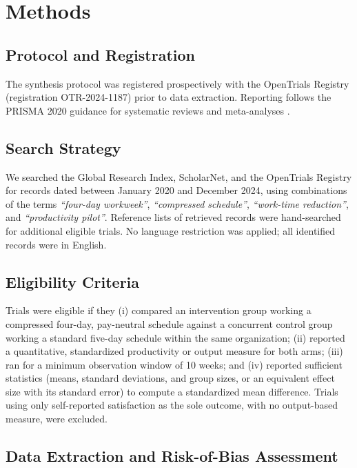 \section{Methods}

\subsection{Protocol and Registration}

The synthesis protocol was registered prospectively with the OpenTrials Registry
(registration OTR-2024-1187) prior to data extraction. Reporting follows the PRISMA 2020
guidance for systematic reviews and meta-analyses \citep{page2021prisma}.

\subsection{Search Strategy}

We searched the Global Research Index, ScholarNet, and the OpenTrials Registry for records
dated between January 2020 and December 2024, using combinations of the terms
\emph{``four-day workweek''}, \emph{``compressed schedule''}, \emph{``work-time
reduction''}, and \emph{``productivity pilot''}. Reference lists of retrieved records were
hand-searched for additional eligible trials. No language restriction was applied; all
identified records were in English.

\subsection{Eligibility Criteria}

Trials were eligible if they (i) compared an intervention group working a compressed
four-day, pay-neutral schedule against a concurrent control group working a standard
five-day schedule within the same organization; (ii) reported a quantitative,
standardized productivity or output measure for both arms; (iii) ran for a minimum
observation window of 10 weeks; and (iv) reported sufficient statistics (means, standard
deviations, and group sizes, or an equivalent effect size with its standard error) to
compute a standardized mean difference. Trials using only self-reported satisfaction as
the sole outcome, with no output-based measure, were excluded.

\subsection{Data Extraction and Risk-of-Bias Assessment}

